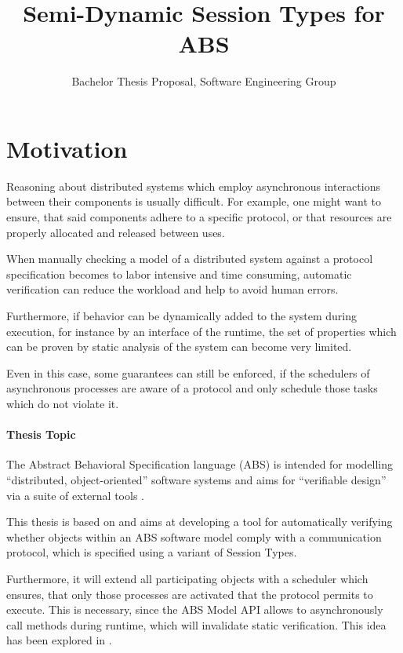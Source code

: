 \documentclass[paper=a4,nochapname,accentcolor=tud9c]{tudexercise}
\title{Semi-Dynamic Session Types for ABS}
\subtitle{Bachelor Thesis Proposal, Software Engineering Group}
\begin{document}
%
\maketitle
%
\tableofcontents

\section{Motivation}
Reasoning about distributed systems which employ asynchronous interactions between their
components is usually difficult. %
For example, one might want to ensure, that said components adhere to a specific
protocol, or that resources are properly allocated and released between uses.

When manually checking a model of a distributed system against a protocol
specification becomes to labor intensive and time consuming, automatic verification
can reduce the workload and help to avoid human errors.

Furthermore, if behavior can be dynamically added to the system during execution,
for instance by an interface of the runtime, the set of properties which
can be proven by static analysis of the system can become very limited.

Even in this case, some guarantees can still be enforced, if the schedulers of
asynchronous processes are aware of a protocol and only schedule those tasks
which do not violate it.

\paragraph{Thesis Topic}

The Abstract Behavioral Specification language (ABS) is intended for modelling
``distributed, object-oriented'' software systems \cite{johnsen2010abs} and
aims for ``verifiable design'' via a suite of external tools \cite{absdesign}.

This thesis is based on %
\cite{kamburjan2018stateful, kamburjan2016session} and
aims at developing a tool for automatically verifying whether objects within an
ABS software model comply with a communication protocol, which is specified
using a variant of Session Types. %

Furthermore, it will extend all participating objects with a scheduler \cite{bjork2013user} which
ensures, that only those processes are activated that the protocol permits to execute.
This is necessary, since the ABS Model API \cite{schlatte2018release} allows to asynchronously call methods during
runtime, which will invalidate static verification.
This idea has been explored in \cite{kamburjan2016session}.
\end{document}
